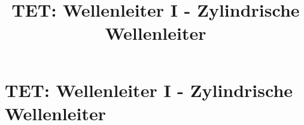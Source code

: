 
\usepackage{tikz-3dplot}
\usetikzlibrary{shapes.geometric}
\usepackage{pgfplots}
\pgfplotsset{compat = newest}
\newcommand{\Tube}[6][]%
{   \colorlet{InColor}{#4}
    \colorlet{OutColor}{#5}
    \foreach \I in {1,...,#3}
    {   \pgfmathsetlengthmacro{\h}{(\I-1)/#3*#2}
        \pgfmathsetlengthmacro{\r}{sqrt(pow(#2,2)-pow(\h,2))}
        \pgfmathsetmacro{\c}{(\I-0.5)/#3*100}
        \draw[InColor!\c!OutColor, line width=\r, #1] #6;
    }
}

\title[TET: Wellenleiter I - Zylindrische Wellenleiter]{TET: Wellenleiter I - Zylindrische Wellenleiter}


% 
% 

\maketitle

% 
% 
\section{TET: Wellenleiter I - Zylindrische Wellenleiter}

